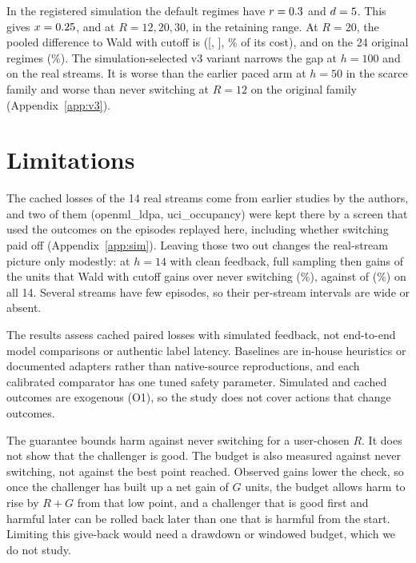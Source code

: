 \documentclass[10pt]{article}
\theoremstyle{plain}
\theoremstyle{definition}
\begin{document}
In the registered simulation the default regimes have $r=0.3$ and $d=5$. This gives $x=0.25$, \DefXTwenty{} and \DefXThirty{} at $R=12,20,30$, in the retaining range. At $R=20$, the pooled difference to Wald with cutoff is \SimVsWaldDelta{} ([\SimVsWaldLo, \SimVsWaldHi], \SimVsWaldPct\% of its cost), and \OrigDelta{} on the 24 original regimes (\OrigPct\%). The simulation-selected v3 variant narrows the gap at $h=100$ and on the real streams. It is worse than the earlier paced arm at $h=50$ in the scarce family and worse than never switching at $R=12$ on the original family (Appendix~\ref{app:v3}).

\begin{table}[!htbp]
\caption{Regime map: Spearman correlation of $x=rd/h$ with $L$, the share of the unconstrained rule's improvement given up, and median $L$ by bin of $x$. ``Clusters'' counts regimes or streams; analysis units also vary by arm and headroom.}\label{tab:regime}
\centering\scriptsize
\resizebox{\linewidth}{!}{}
\end{table}

\FloatBarrier
\section{Limitations}\label{sec:limits}
The cached losses of the 14 real streams come from earlier studies by the authors, and two of them (openml\_ldpa, uci\_occupancy) were kept there by a screen that used the outcomes on the episodes replayed here, including whether switching paid off (Appendix~\ref{app:sim}). Leaving those two out changes the real-stream picture only modestly: at $h=14$ with clean feedback, full sampling then gains \SensPiVsNeverFourteen{} of the \SensWaldGain{} units that Wald with cutoff gains over never switching (\SensPiShareFourteen\%), against \RealPiVsNeverCleanHfourteen{} of \RealWaldGain{} (\RealPiShareFourteen\%) on all 14. Several streams have few episodes, so their per-stream intervals are wide or absent.

The results assess cached paired losses with simulated feedback, not end-to-end model comparisons or authentic label latency. Baselines are in-house heuristics or documented adapters rather than native-source reproductions, and each calibrated comparator has one tuned safety parameter. Simulated and cached outcomes are exogenous (O1), so the study does not cover actions that change outcomes.

The guarantee bounds harm against never switching for a user-chosen $R$. It does not show that the challenger is good. The budget is also measured against never switching, not against the best point reached. Observed gains lower the check, so once the challenger has built up a net gain of $G$ units, the budget allows harm to rise by $R+G$ from that low point, and a challenger that is good first and harmful later can be rolled back later than one that is harmful from the start. Limiting this give-back would need a drawdown or windowed budget, which we do not study.
\end{document}
